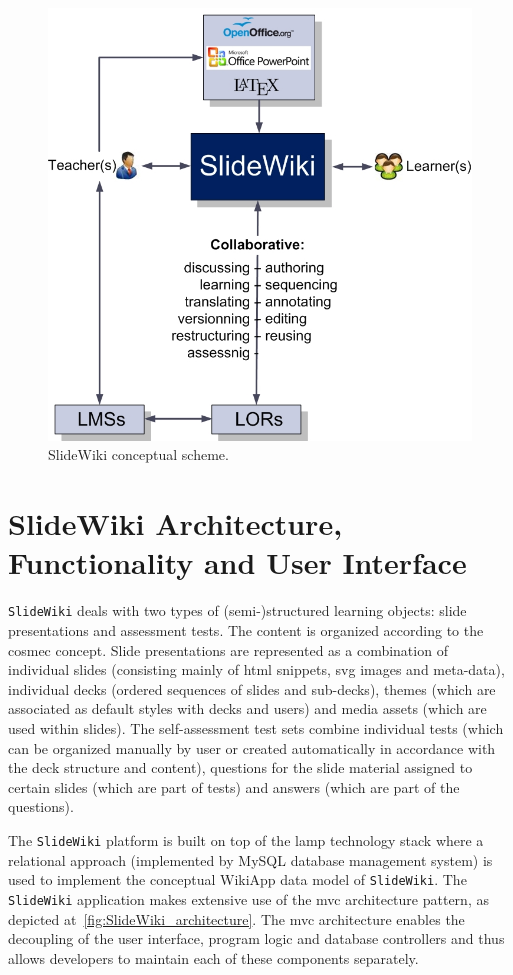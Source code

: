 \documentclass[PhD, Submit, ngerman,UKenglish,table]{scrbook}
\begin{document}
\begin{figure}[tb]
\centering
	\includegraphics[width=0.6\columnwidth]{images/conceptual_scheme.jpg}
	\caption{SlideWiki conceptual scheme.}
	\label{fig:SlideWiki_scheme}
\end{figure}

\section{SlideWiki Architecture, Functionality and User Interface}
\label{sec:architecture}

\texttt{SlideWiki} deals with two types of (semi-)structured learning objects: slide presentations and assessment tests.
The content is organized according to the \gls{cosmec} concept.
Slide presentations are represented as a combination of individual slides (consisting mainly of \gls{html} snippets, \gls{svg} images and meta-data), individual decks (ordered sequences of slides and sub-decks), themes (which are associated as default styles with decks and users) and media assets (which are used within slides).
The self-assessment test sets combine individual tests (which can be organized manually by user or created automatically in accordance with the deck structure and content), questions for the slide material assigned to certain slides (which are part of tests) and answers (which are part of the questions).

The \texttt{SlideWiki} platform is built on top of the \gls{lamp} technology stack where a relational approach (implemented by MySQL database management system) is used to implement the conceptual WikiApp data model of \texttt{SlideWiki}.
The \texttt{SlideWiki} application makes extensive use of the \gls{mvc} architecture pattern, as depicted at~\autoref{fig:SlideWiki_architecture}.
The \gls{mvc} architecture enables the decoupling of the user interface, program logic and database controllers and thus allows developers to maintain each of these components separately.
\end{document}
